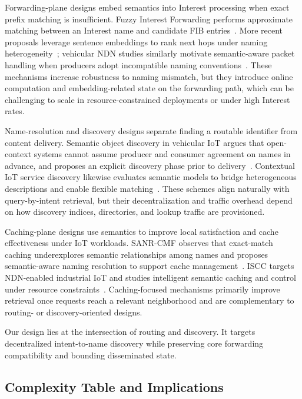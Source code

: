 \documentclass[journal]{IEEEtran}
\begin{document}
Forwarding-plane designs embed semantics into Interest processing when exact prefix matching is insufficient. Fuzzy Interest Forwarding performs approximate matching between an Interest name and candidate FIB entries~\cite{fuzzy_forwarding}. More recent proposals leverage sentence embeddings to rank next hops under naming heterogeneity~\cite{amadeo2025saf}; vehicular NDN studies similarly motivate semantic-aware packet handling when producers adopt incompatible naming conventions~\cite{dt_vndn_semantic}. These mechanisms increase robustness to naming mismatch, but they introduce online computation and embedding-related state on the forwarding path, which can be challenging to scale in resource-constrained deployments or under high Interest rates.

Name-resolution and discovery designs separate finding a routable identifier from content delivery. Semantic object discovery in vehicular IoT argues that open-context systems cannot assume producer and consumer agreement on names in advance, and proposes an explicit discovery phase prior to delivery~\cite{grewe2018sodi}. Contextual IoT service discovery likewise evaluates semantic models to bridge heterogeneous descriptions and enable flexible matching~\cite{antunes2022context}. These schemes align naturally with query-by-intent retrieval, but their decentralization and traffic overhead depend on how discovery indices, directories, and lookup traffic are provisioned.

Caching-plane designs use semantics to improve local satisfaction and cache effectiveness under IoT workloads. SANR-CMF observes that exact-match caching underexplores semantic relationships among names and proposes semantic-aware naming resolution to support cache management~\cite{sanr_cmf}. ISCC targets NDN-enabled industrial IoT and studies intelligent semantic caching and control under resource constraints~\cite{iscc}. Caching-focused mechanisms primarily improve retrieval once requests reach a relevant neighborhood and are complementary to routing- or discovery-oriented designs.

Our design lies at the intersection of routing and discovery. It targets decentralized intent-to-name discovery while preserving core forwarding compatibility and bounding disseminated state.

\subsection{Complexity Table and Implications}
\label{sec:bg_complexity}
\end{document}
